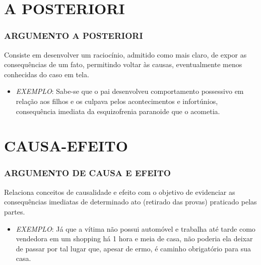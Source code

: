 \documentclass[aspectratio=1610]{beamer}
\begin{document}
\section {A POSTERIORI}
\begin{frame}
  \frametitle{ARGUMENTO A POSTERIORI   }
\begin{center}
Consiste em desenvolver um raciocínio, admitido como mais claro, de expor as consequências de um fato, permitindo voltar às causas, eventualmente menos conhecidas do caso em tela.
\end{center}

\begin{itemize}
  \item \textit{EXEMPLO}: Sabe-se que o pai desenvolveu comportamento possessivo em relação aos filhos e os culpava pelos acontecimentos e infortúnios, consequência imediata da esquizofrenia paranoide que o acometia.
\end{itemize}
\end{frame}

\section {CAUSA-EFEITO}
\begin{frame}
  \frametitle{ARGUMENTO DE CAUSA E EFEITO }
\begin{center}
  Relaciona conceitos de causalidade e efeito com o objetivo de evidenciar as consequências imediatas de determinado ato (retirado das provas) praticado pelas partes.
 \end{center}

\begin{itemize}
  \item \textit{EXEMPLO}: Já que a vítima não possui automóvel e trabalha até tarde como vendedora em um shopping há 1 hora e meia de casa, não poderia ela deixar de passar por tal lugar que, apesar de ermo, é caminho obrigatório para sua casa.
\end{itemize}
\end{frame}

\end{document}
